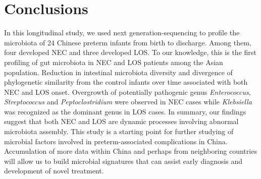 \documentclass[fleqn,10pt, lineno]{wlpeerj} %
\begin{document}
\section*{Conclusions}
In this longitudinal study, we used next generation-sequencing to profile the microbiota of 24 Chinese preterm infants from birth to discharge.  Among them, four developed NEC and three developed LOS. To our knowledge, this is the first profiling of gut microbiota in NEC and LOS patients among the Asian population. Reduction in intestinal microbiota diversity and divergence of phylogenetic similarity from the control infants over time associated with both NEC and LOS onset. Overgrowth of potentially pathogenic genus \textit{Enterococcus}, \textit{Streptococcus} and \textit{Peptoclostridium}  were observed in NEC cases while \textit{Klebsiella} was recognized as the dominant genus in LOS cases. In summary, our findings suggest that both NEC and LOS are dynamic processes involving abnormal microbiota assembly. This study is a starting point for further studying of microbial factors involved in preterm-associated complications in China. Accumulation of more data within China and perhaps from neighboring countries will allow us to build microbial signatures that can assist early diagnosis and development of novel treatment.



\end{document}

